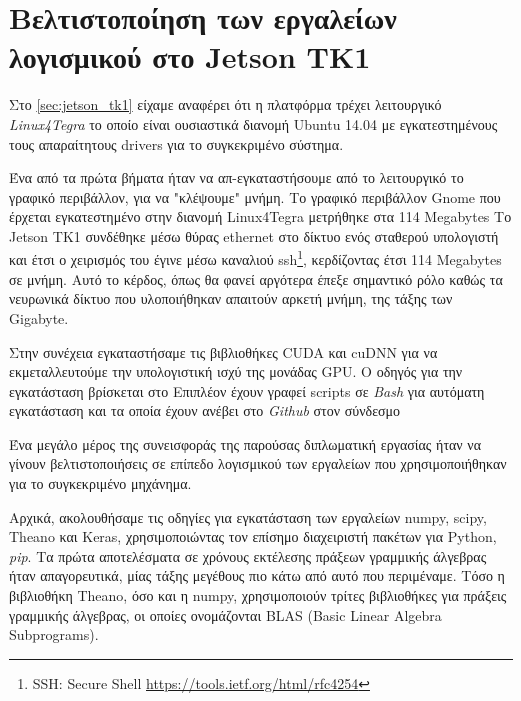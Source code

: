 \section{Βελτιστοποίηση των εργαλείων λογισμικού στο Jetson TK1}

Στο \autoref{sec:jetson_tk1} είχαμε αναφέρει ότι η πλατφόρμα τρέχει
λειτουργικό \emph{Linux4Tegra} το οποίο είναι ουσιαστικά διανομή Ubuntu 14.04
με εγκατεστημένους τους απαραίτητους drivers για το συγκεκριμένο σύστημα.


Ένα από τα πρώτα βήματα ήταν να απ-εγκαταστήσουμε από το λειτουργικό το
γραφικό περιβάλλον, για να "κλέψουμε" μνήμη. Το γραφικό περιβάλλον Gnome
που έρχεται εγκατεστημένο στην διανομή Linux4Tegra μετρήθηκε στα 114 Megabytes
Το Jetson TK1 συνδέθηκε
μέσω θύρας ethernet στο δίκτυο ενός σταθερού υπολογιστή και έτσι ο χειρισμός
του έγινε μέσω καναλιού ssh\footnote{SSH: Secure Shell \href{https://tools.ietf.org/html/rfc4254}{{https://tools.ietf.org/html/rfc4254}}},
κερδίζοντας έτσι 114 Megabytes σε μνήμη. Αυτό το κέρδος, όπως θα φανεί
αργότερα έπεξε σημαντικό ρόλο καθώς τα νευρωνικά δίκτυο που υλοποιήθηκαν
απαιτούν αρκετή μνήμη, της τάξης των Gigabyte.

Στην συνέχεια εγκαταστήσαμε τις βιβλιοθήκες CUDA και cuDNN για να εκμεταλλευτούμε
την υπολογιστική ισχύ της μονάδας GPU. Ο οδηγός για την εγκατάσταση βρίσκεται
στο %
Επιπλέον έχουν γραφεί scripts σε \emph{Bash} για αυτόματη εγκατάσταση και τα
οποία έχουν ανέβει στο \emph{Github} στον σύνδεσμο %

Ένα μεγάλο μέρος της συνεισφοράς της παρούσας διπλωματική εργασίας
ήταν να γίνουν βελτιστοποιήσεις σε επίπεδο λογισμικού των εργαλείων που χρησιμοποιήθηκαν
για το συγκεκριμένο μηχάνημα.

Αρχικά, ακολουθήσαμε τις οδηγίες για εγκατάσταση των εργαλείων numpy, scipy, Theano
και Keras, χρησιμοποιώντας τον επίσημο διαχειριστή πακέτων για Python, \emph{pip}.
Τα πρώτα αποτελέσματα σε χρόνους εκτέλεσης πράξεων γραμμικής άλγεβρας ήταν
απαγορευτικά, μίας τάξης μεγέθους πιο κάτω από αυτό που περιμέναμε.
Τόσο η βιβλιοθήκη Theano, όσο και η numpy, χρησιμοποιούν τρίτες βιβλιοθήκες
για πράξεις γραμμικής άλγεβρας, οι οποίες ονομάζονται BLAS (Basic Linear Algebra Subprograms).

